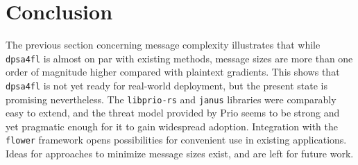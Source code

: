 \documentclass{article}
\begin{document}



\section{Conclusion}
The previous section concerning message complexity illustrates that while
\texttt{dpsa4fl} is almost on par with existing methods, message sizes are more
than one order of magnitude higher compared with plaintext gradients.
This shows that \texttt{dpsa4fl} is not yet ready for real-world deployment, but
the present state is promising nevertheless. The \texttt{libprio-rs} and \texttt{janus}
libraries were comparably easy to extend, and the threat model provided by Prio
seems to be strong and yet pragmatic enough for it to gain widespread adoption.
Integration with the \texttt{flower} framework opens possibilities for convenient
use in existing applications. Ideas for approaches to minimize message sizes
exist, and are left for future work.



\end{document}
